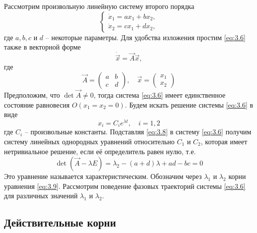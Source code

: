 Рассмотрим произвольную линейную систему второго порядка 
\begin{equation}
        \label{eq:3.6}
        \begin{cases}
                \dot x_1 = ax_1 + bx_2, \\
                \dot x_2 = cx_1 +dx_2,
        \end{cases}
\end{equation}
где $a, b ,c$ и $d$ -- некоторые параметры. Для удобства изложения простим \eqref{eq:3.6} также в векторной форме
\begin{equation}
        \label{eq:3.7}
        \dot{\vec x} = \vec A \vec x, 
\end{equation}
где
\begin{equation}
        \label{eq:}
        \vec A =
        \begin{pmatrix}
                a & b \\
                c & d
        \end{pmatrix}, \quad 
        \vec x = 
        \begin{pmatrix}
                x_1 \\
                x_2 
        \end{pmatrix}
\end{equation}
Предположим, что $\det \vec A \neq 0$, тогда система \eqref{eq:3.6} имеет единственное состояние равновесия $O(x_1=x_2=0)$. Будем искать решение системы \eqref{eq:3.6} в виде
\begin{equation}
        \label{eq:3.8}
        x_i = C_i e^{ \lambda t}, \quad i=1,2   
\end{equation}
где $C_i$ -- произвольные константы. Подставляя 
\eqref{eq:3.8} в систему \eqref{eq:3.6} получим систему линейных однородных уравнений относительно $C_1$ и $C_2$, которая имеет нетривиальное решение, если её определитель равен нулю, т.е.
\begin{equation}
        \label{eq:3.9}
        \det(\vec A - \lambda E) = \lambda_2 - (a+d) \lambda + ad - bc =0
\end{equation}
Это уравнение называется характеристическим. Обозначим через $\lambda_1$ и $\lambda_2$ корни уравнения \eqref{eq:3.9}. Рассмотрим поведение фазовых траекторий системы \eqref{eq:3.6} для различных значений $\lambda_1$ и $\lambda_2$.

\subsection{Действительные корни}%
\label{ssub:3.2.1}

